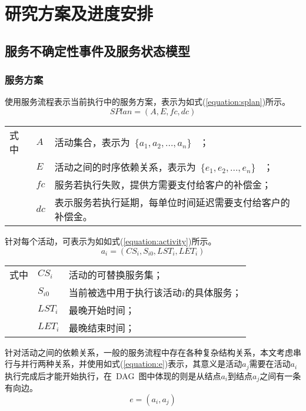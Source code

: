 \section{研究方案及进度安排}

\subsection{服务不确定性事件及服务状态模型}

\subsubsection{服务方案}

使用服务流程表示当前执行中的服务方案，表示为如式(\ref{equation:splan})所示。
\begin{equation}\label{equation:splan}
SPlan = \left( {A,E,fc,dc} \right)
\end{equation}
\begin{tabularx}{\textwidth}{@{}l@{\quad}l@{\pozhehao }X@{}}
    式中
    & ${A}$ & 活动集合，表示为~$\{{a_1}, {a_2},...,{a_n}\}$ ~； \\
    & ${E}$ & 活动之间的时序依赖关系，表示为~$\{{e_1}, {e_2},...,{e_n}\}$ ~；\\
    & ${fc}$ & 服务若执行失败，提供方需要支付给客户的补偿金；\\
    & ${dc}$ & 表示服务若执行延期，每单位时间延迟需要支付给客户的补偿金。
\end{tabularx}\vspace{\wordsep}

针对每个活动，可表示为如如式(\ref{equation:activity})所示。
\begin{equation}\label{equation:activity}
{a_i} = ({CS_i}, {S_{i0}}, {LST_i}, {LET_i})
\end{equation}
\begin{tabularx}{\textwidth}{@{}l@{\quad}l@{\pozhehao }X@{}}
    式中
    & ${CS_i}$ & 活动的可替换服务集；\\
    & ${S_{i0}}$ & 当前被选中用于执行该活动$i$的具体服务；\\
    & ${LST_i}$ & 最晚开始时间；\\
    & ${LET_i}$ & 最晚结束时间；
\end{tabularx}\vspace{\wordsep}

针对活动之间的依赖关系，一般的服务流程中存在各种复杂结构关系，本文考虑串行与并行两种关系，并使用如式(\ref{equation:e})表示，其意义是活动${a_j}$需要在活动${a_i}$执行完成后才能开始执行，在~DAG~图中体现的则是从结点${a_i}$到结点${a_j}$之间有一条有向边。
\begin{equation}\label{equation:e}
e = ({a_i},{a_j})
\end{equation}

